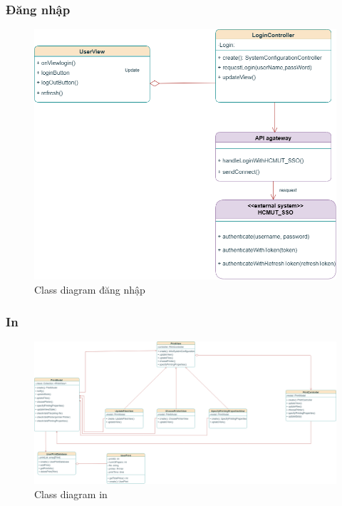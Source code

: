 \documentclass[a4paper]{article}
\begin{document}
\subsubsection{Đăng nhập}
\begin{figure}[h!]
\begin{center}
\includegraphics[width=16cm]{picture/Class_diagram_login-login.drawio (1).png}
\caption{Class diagram đăng nhập}
\end{center}
\end{figure}
\newpage
\subsubsection{In}
\begin{figure}[h!]
\begin{center}
\includegraphics[width=16cm]{picture/Class_diagram_print.drawio.png}
\caption{Class diagram in}
\end{center}
\end{figure}
\newpage
\end{document}
